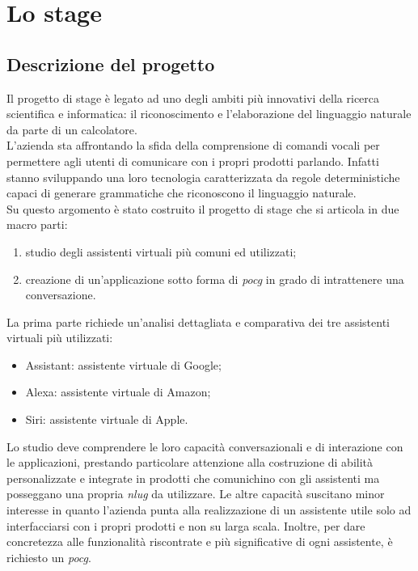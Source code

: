 
\chapter{Lo stage}
\label{cap:lo-stage}


\section{Descrizione del progetto}
Il progetto di stage è legato ad uno degli ambiti più innovativi della ricerca scientifica e informatica: il riconoscimento e l'elaborazione del linguaggio naturale da parte di un calcolatore. \\
L'azienda sta affrontando la sfida della comprensione di comandi vocali per permettere agli utenti di comunicare con i propri prodotti parlando. Infatti stanno sviluppando una loro tecnologia caratterizzata da regole deterministiche capaci di generare grammatiche che riconoscono il linguaggio naturale. \\ Su questo argomento è stato costruito il progetto di stage che si articola in due macro parti:
\begin{enumerate}
	\item studio degli assistenti virtuali più comuni ed utilizzati;
	\item creazione di un'applicazione sotto forma di \emph{\gls{pocg}} in grado di intrattenere una conversazione.
\end{enumerate}
La prima parte richiede un'analisi dettagliata e comparativa dei tre assistenti virtuali più utilizzati:
\begin{itemize}
	\item Assistant: assistente virtuale di Google;
	\item Alexa: assistente virtuale di Amazon;
	\item Siri: assistente virtuale di Apple.
\end{itemize}
Lo studio deve comprendere le loro capacità conversazionali e di interazione con le applicazioni, prestando particolare attenzione alla costruzione di abilità personalizzate e integrate in prodotti che comunichino con gli assistenti ma posseggano una propria \emph{\gls{nlug}} da utilizzare. Le altre capacità suscitano minor interesse in quanto l'azienda punta alla realizzazione di un assistente utile solo ad interfacciarsi con i propri prodotti e non su larga scala. Inoltre, per dare concretezza alle funzionalità riscontrate e più significative di ogni assistente, è richiesto un \emph{\gls{pocg}}.\\

